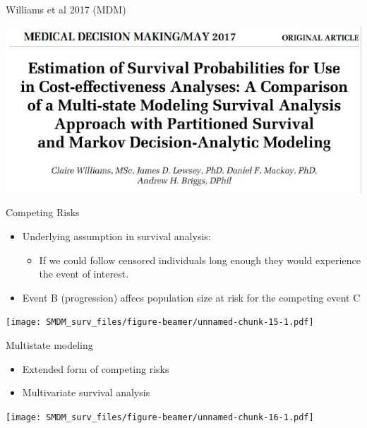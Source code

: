 \documentclass[ignorenonframetext,]{beamer}
\providecommand{\tightlist}{%
  \setlength{\itemsep}{0pt}\setlength{\parskip}{0pt}}
\begin{document}
\begin{frame}

Williams et al 2017 (MDM)

\includegraphics[width=1\linewidth]{figures/williams2017}

\end{frame}

\begin{frame}{Competing Risks}

\begin{itemize}
\tightlist
\item
  Underlying assumption in survival analysis:

  \begin{itemize}
  \tightlist
  \item
    If we could follow censored individuals long enough they would
    experience the event of interest.
  \end{itemize}
\item
  Event B (progression) affecs population size at risk for the competing
  event C
\end{itemize}

\end{frame}

\begin{frame}

\texttt{[image: SMDM\_surv\_files/figure-beamer/unnamed-chunk-15-1.pdf]}

\end{frame}

\begin{frame}{Multistate modeling}

\begin{itemize}
\tightlist
\item
  Extended form of competing risks
\item
  Multivariate survival analysis
\end{itemize}

\texttt{[image: SMDM\_surv\_files/figure-beamer/unnamed-chunk-16-1.pdf]}

\end{frame}
\end{document}

